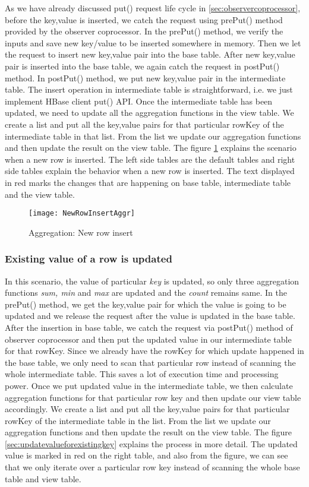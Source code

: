 \documentclass[11pt,a4paper,bibtotoc,idxtotoc,headsepline,footsepline,footexclude,BCOR12mm,DIV13]{scrbook}
\begin{document}
As we have already discussed put() request life cycle in \ref{sec:observercoprocessor}, before the key,value is inserted, we catch the request using prePut() method provided by the observer coprocessor. In the prePut() method, we verify the inputs and save new key/value to be inserted somewhere in memory. Then we let the request to insert new key,value pair into the base table. After new key,value pair is inserted into the base table, we again catch the request in postPut() method. In postPut() method, we put new key,value pair in the intermediate table. The insert operation in intermediate table is straightforward, i.e. we just implement HBase client put() API. Once the intermediate table has been updated, we need to update all the aggregation functions in the view table. We create a list and put all the key,value pairs for that particular rowKey of the intermediate table in that list. From the list we update our aggregation functions and then update the result on the view table. The figure \ref{sec:newrowinsertagggregation} explains the scenario when a new row is inserted. The left side tables are the default tables and right side tables explain the behavior when a new row is inserted. The text displayed in red marks the changes that are happening on base table, intermediate table and  the view table. 
\begin{figure}
    \centering
    \texttt{[image: NewRowInsertAggr]}
    \caption{Aggregation: New row insert}
    \label{sec:newrowinsertagggregation}
    
\end{figure}

\newpage
\subsubsection{Existing value of a row is updated}
In this scenario, the value of particular \emph{key} is updated, so only three aggregation functions \emph{sum, min} and \emph{max} are updated and the \emph{count} remains same. In the prePut() method, we get the key,value pair for which the value is going to be updated and we release the request after the value is updated in the base table. After the insertion in base table, we catch the request via postPut() method of observer coprocessor and then put the updated value in our intermediate table for that rowKey. Since we already have the rowKey for which update happened in the base table, we only need to scan that particular row instead of scanning the whole intermediate table. This saves a lot of execution time and processing power. Once we put updated value in the intermediate table, we then calculate aggregation functions for that particular row key and then update our view table accordingly. We create a list and put all the key,value pairs for that particular rowKey of the intermediate table in the list. From the list we update our aggregation functions and then update the result on the view table. The figure \ref{sec:updatevalueforexistingkey} explains the process in more detail. The updated value is marked in red on the right table, and also from the figure, we can see that we only iterate over a particular row key instead of scanning the whole base table and view table.
\end{document}
